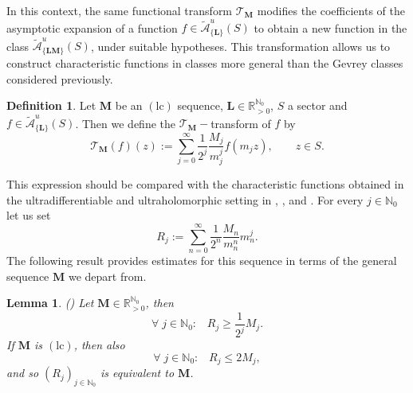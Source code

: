 \documentclass[11pt,a4paper]{article}
\theoremstyle{plain}
\newtheorem{lemma}[proposition]{Lemma}
\theoremstyle{definition}
\newtheorem{definition}[proposition]{Definition}
\newcommand{\RR}{\mathbb{R}}
\newcommand{\NN}{\mathbb{N}}
\newcommand{\M}{\mathbf{M}}
\newcommand{\LL}{\mathbf{L}}
\begin{document}
In this context, the same functional transform $\mathcal{T}_{\M}$ modifies the coefficients of the asymptotic expansion of a function $f\in\widetilde{\mathcal{A}}^u_{\{\LL\}} (S)$ to obtain a new function in the class $\widetilde{\mathcal{A}}^u_{\{\LL\M\}} (S)$, under suitable hypotheses. This transformation allows us to construct characteristic functions in classes more general than the Gevrey classes considered previously.
\begin{definition}
	Let $\M$ be an \hyperlink{lc}{$(\text{lc})$} sequence, $\LL\in\RR_{>0}^{\NN_0}$, $S$ a sector and $f\in\widetilde{\mathcal{A}}^u_{\{\LL\}} (S)$. 
Then we define the $\mathcal{T}_{\M}-$transform of $f$ by
	\begin{equation*}%
		\mathcal{T}_{\M}(f)(z):= \sum_{j=0}^{\infty}\frac{1}{2^j} \frac{M_j}{m_j^j} f(m_j z), \qquad z\in S.
	\end{equation*}
\end{definition}
This expression should be compared with the characteristic functions obtained in the ultradifferentiable and ultraholomorphic setting in \cite[Thm. 1]{thilliez}, \cite[Lemma 2.9]{compositionpaper}, \cite[Lemma 1]{Poschel} and \cite[Definition 4.5.]{ultraholomstab}. 
For every $j\in\NN_0$ let us set
\begin{equation*}%
	R_j:=\sum^{\infty}_{n=0} \frac{1}{2^n} \frac{M_n}{m_n^n}m_n^j.
\end{equation*}
The following result provides estimates for this sequence in terms of the general sequence $\M$ we depart from.

\begin{lemma}\label{Scomplemma}(\cite[Lemma 4.6]{ultraholomstab})
	Let $\M\in\RR_{>0}^{\NN_0}$, then
	$$\forall\;j\in\NN_0:\;\;\;R_j\ge\frac{1}{2^j} M_j.$$
	If $\M$ is \hyperlink{lc}{$(\text{lc})$}, then also
	$$\forall\;j\in\NN_0:\;\;\;R_j\le 2 M_j,$$
	and so $(R_j)_{j\in\NN_0}$ is equivalent to $\M$.
\end{lemma}


\end{document}

